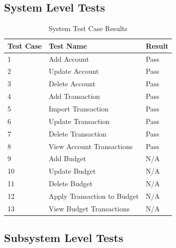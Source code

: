 \documentclass[12pt]{article}
\begin{document}
\subsection{System Level Tests}
\begin{table}[htbp]
\centering
\caption {System Test Case Results}
\label{test-result}
\begin{tabularx}{\textwidth}{ | l | X | l |}
\hline
\textbf{Test Case}  &\textbf {Test Name}   &  \textbf{Result}                         \\ \hline
1 & Add Account &  Pass				\\ \hline
2 & Update Account & Pass 			\\ \hline
3 & Delete Account & Pass				\\ \hline
4 & Add Transaction & Pass			\\ \hline
5 & Import Transaction &	Pass	 		\\ \hline
6 & Update Transaction &	Pass			\\ \hline
7 & Delete Transaction & 	Pass			\\ \hline
8 & View Account Transactions & Pass		 \\ \hline
9 & Add Budget & N/A				\\ \hline
10 & Update Budget & N/A			\\ \hline
11 & Delete Budget & N/A				\\ \hline
12 & Apply Transaction to Budget & N/A	\\ \hline
13 & View Budget Transactions & N/A		\\ \hline
\end{tabularx}
\end{table}
\clearpage

\subsection {Subsystem Level Tests}
\end{document}
